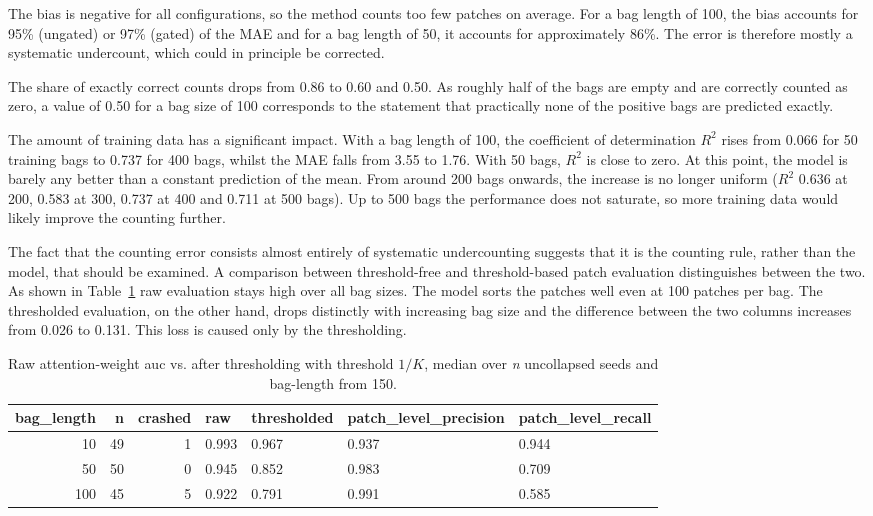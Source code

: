 \documentclass[12pt,parskip = half, DIV=classic,listof=totoc]{scrartcl}
\begin{document}
			The bias is negative for all configurations, so the method counts too few patches on average. 
			For a bag length of 100, the bias accounts for 95\% (ungated) or 97\% (gated) of the MAE and for
			a bag length of 50, it accounts for approximately 86\%. 
			The error is therefore mostly a systematic undercount, which could in principle be corrected.

			The share of exactly correct counts drops from 0.86 to 0.60 and 0.50. As roughly half of the bags are empty and are correctly counted as zero,
			a value of 0.50 for a bag size of 100 corresponds to the statement that practically none of the positive bags are predicted exactly.

			The amount of training data has a significant impact. With a bag length of 100, the
			coefficient of determination $R^2$ rises from 0.066 for 50 training bags to 0.737 for 400 bags, whilst the MAE falls from
			3.55 to 1.76. With 50 bags, $R^2$ is close to zero. At this point, the model is barely
			any better than a constant prediction of the mean. From around 200 bags onwards, the increase
			is no longer uniform ($R^2$ 0.636 at 200, 0.583 at 300, 0.737 at 400 and 0.711 at
			500 bags). Up to 500 bags the performance does not saturate, so more training data would likely improve the counting further.

			The fact that the counting error consists almost entirely of systematic undercounting suggests that it is the counting rule, 
			rather than the model, that should be examined. A comparison between threshold-free and threshold-based patch evaluation 
			distinguishes between the two. As shown in Table~\ref{tab:count-mechanism} raw evaluation stays high over all bag sizes.
			The model sorts the patches well even at 100 patches per bag. The thresholded evaluation, on the other hand, drops distinctly 
			with increasing bag size and the difference between the two columns increases from 0.026 to 0.131. This loss is caused only by 
			the thresholding.

			\begin{table}[htbp]
				\centering
				\small
				\begin{tabular}{rrrllll}
					\toprule
					bag\_length & n & crashed & raw & thresholded	& patch\_level\_precision & patch\_level\_recall \\
					\midrule
					10 & 49 & 1 & 0.993 & 0.967 & 0.937 & 0.944 \\
					\midrule
					50 & 50 & 0 & 0.945 & 0.852 & 0.983 & 0.709 \\
					\midrule
					100 & 45 & 5 & 0.922 & 0.791 & 0.991 & 0.585 \\
					\bottomrule
				\end{tabular}
				\caption[Raw \acs*{auc} vs. after thresholding]{Raw attention-weight \ac{auc} vs. after thresholding with threshold $1/K$, median over \emph{n} uncollapsed seeds
				 and bag-length from 150.}
				\label{tab:count-mechanism}
			\end{table}
\end{document}
